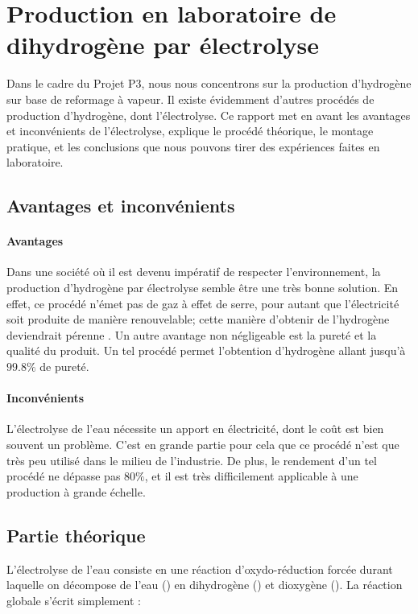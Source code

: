 \section{Production en laboratoire de dihydrogène par électrolyse}

Dans le cadre du Projet P3, nous nous concentrons sur la production d'hydrogène sur base de reformage à vapeur.
Il existe évidemment d'autres procédés de production d'hydrogène, dont l'électrolyse. Ce rapport met en avant les
avantages et inconvénients de l'électrolyse, explique le procédé théorique, le montage pratique, et les conclusions 
que nous pouvons tirer des expériences faites en laboratoire.

\subsection{Avantages et inconvénients}

\paragraph{Avantages} Dans une société où il est devenu impératif de respecter l'environnement, la production 
d'hydrogène par électrolyse semble être une très bonne solution. En effet, ce procédé n'émet pas de gaz à effet de
serre, pour autant que l'électricité soit produite de manière renouvelable; cette manière d'obtenir de l'hydrogène 
deviendrait pérenne \cite{ProdMas}. Un autre avantage non 
négligeable est la pureté et la qualité du produit. Un tel procédé permet l'obtention d'hydrogène allant jusqu'à
$99.8 \%$ de pureté.

\paragraph{Inconvénients} L'électrolyse de l'eau nécessite un apport en électricité, dont le coût est bien souvent 
un problème. C'est en grande partie pour cela que ce procédé n'est que très peu utilisé dans le milieu de l'industrie. 
De plus, le rendement d'un tel procédé ne dépasse pas $80 \%$, et il est très difficilement applicable à une production 
à grande échelle\cite{AFHYPAC}.

\subsection{Partie théorique}


L’électrolyse de l’eau consiste en une réaction d’oxydo-réduction forcée durant laquelle on décompose de l’eau ()
en dihydrogène () et dioxygène (). La réaction globale s’écrit simplement : 

